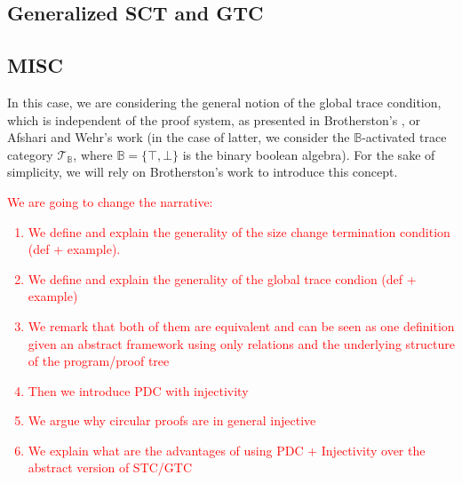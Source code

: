 \documentclass{article}
\begin{document}
\subsection{Generalized SCT and GTC}


\subsection{MISC}

In this case, we are considering the general notion of the global trace condition, which is independent of the proof system, as presented in Brotherston's \cite{brotherston}, or Afshari and Wehr's \cite{Afshari_Wehr_2024} work (in the case of latter, we consider the $\mathbb{B}$-activated trace category $\mathcal{T}_{\mathbb{B}}$, where $\mathbb{B} = \{\top, \bot\}$ is the binary boolean algebra). For the sake of simplicity, we will rely on Brotherston's work to introduce this concept.

 




\textcolor{red}{
We are going to change the narrative:
\begin{enumerate}
    \item We define and explain the generality of the size change termination condition (def + example).
    \item We define and explain the generality of the global trace condion (def + example)
    \item We remark that both of them are equivalent and can be seen as one definition given an abstract framework using only relations and the underlying structure of the program/proof tree
    \item Then we introduce PDC with injectivity
    \item We argue why circular proofs are in general injective
    \item We explain what are the advantages of using PDC + Injectivity over the abstract version of STC/GTC
\end{enumerate}
}
\end{document}
